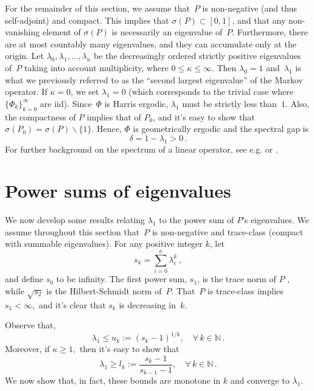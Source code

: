 \documentclass[11pt]{article}
\begin{document}
	For the remainder of this section, we assume that~$P$ is
        non-negative (and thus self-adjoint) and compact.  This
        implies that $\sigma(P) \subset [0,1]$, and that any
        non-vanishing element of $\sigma(P)$ is necessarily an
        eigenvalue of~$P$.  Furthermore, there are at most countably
        many eigenvalues, and they can accumulate only at the
        origin. Let $\lambda_0, \lambda_1, \dots, \lambda_{\kappa}$ be
        the decreasingly ordered strictly positive eigenvalues of~$P$
        taking into account multiplicity, where $0 \leq \kappa \leq
        \infty$. Then $\lambda_0=1$ and~$\lambda_1$ is what we
        previously referred to as the ``second largest eigenvalue'' of
        the Markov operator.  If $\kappa = 0$, we set $\lambda_1 = 0$
        (which corresponds to the trivial case where
        $\{\Phi_k\}_{k=0}^{\infty}$ are iid). Since~$\Phi$ is Harris
        ergodic, $\lambda_1$ must be strictly less than~$1$.  Also,
        the compactness of $P$ implies that of $P_0$, and it's easy to
        show that $\sigma(P_0) = \sigma(P) \backslash \{1\}$.  Hence,
        $\Phi$ is geometrically ergodic and the spectral gap is
	\[
	\delta = 1-\lambda_1 > 0 \,.
	\]
	For further background on the spectrum of a linear operator,
        see e.g. \cite{helmberg2014introduction} or
        \cite{ahues2001spectral}.

	\section{Power sums of eigenvalues} \label{powersum}
	
	We now develop some results relating $\lambda_1$ to the power
        sum of $P$'s eigenvalues.  We assume throughout this section
        that~$P$ is non-negative and trace-class (compact with
        summable eigenvalues).  For any positive integer $k$, let
	\[
	s_k = \sum_{i=0}^{\kappa} \lambda_i^k \,,
	\]
	and define $s_0$ to be infinity. The first power sum, $s_1$,
        is the trace norm of $P$ \citep[see e.g.][]{conway1990course,
          conway2000course}, while $\sqrt{s_2}$ is the Hilbert-Schmidt
        norm of~$P.$ That~$P$ is trace-class implies $s_1 < \infty,$
        and it's clear that $s_k$ is decreasing in~$k.$
	
	Observe that,
	\begin{equation*} \lambda_1 \leq u_k := (s_k-1)^{1/k},\quad
          \forall \, k \in \mathbb{N} \,.
	\end{equation*}
	Moreover, if $\kappa \geq 1,$ then it's easy to show that
	\begin{equation*} \lambda_1 \geq l_k :=
          \frac{s_k-1}{s_{k-1}-1}, \quad \forall \, k \in \mathbb{N}
          \,.
	\end{equation*}
	We now show that, in fact, these bounds are monotone in $k$
        and converge to $\lambda_1$.
	
\end{document}
